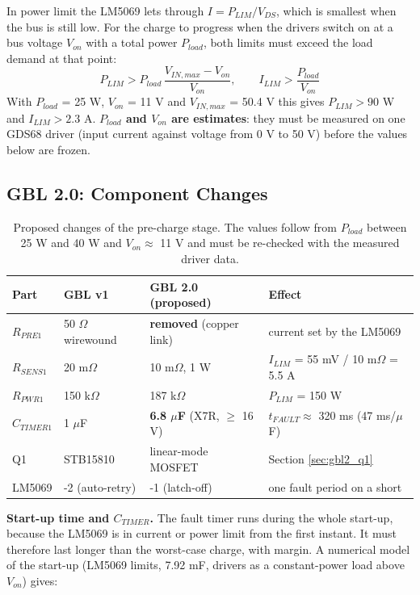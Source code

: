 \documentclass[11pt,a4paper]{article}
\begin{document}
In power limit the LM5069 lets through $I = P_{LIM} / V_{DS}$, which is smallest when the bus is still low. For the charge to progress when the drivers switch on at a bus voltage $V_{on}$ with a total power $P_{load}$, both limits must exceed the load demand at that point:
\begin{equation}
P_{LIM} > P_{load} \, \frac{V_{IN,max} - V_{on}}{V_{on}}, \qquad I_{LIM} > \frac{P_{load}}{V_{on}}
\end{equation}
With $P_{load}$ = 25 W, $V_{on}$ = 11 V and $V_{IN,max}$ = 50.4 V this gives $P_{LIM} > 90$ W and $I_{LIM} > 2.3$ A. \textbf{$P_{load}$ and $V_{on}$ are estimates}: they must be measured on one GDS68 driver (input current against voltage from 0 V to 50 V) before the values below are frozen.

\subsection{GBL 2.0: Component Changes}

\begin{table}[H]
\centering
\small
\begin{tabular}{llll}
\toprule
Part & GBL v1 & GBL 2.0 (proposed) & Effect \\
\midrule
$R_{PRE1}$ & 50 $\Omega$ wirewound & \textbf{removed} (copper link) & current set by the LM5069 \\
$R_{SENS1}$ & 20 m$\Omega$ & 10 m$\Omega$, 1 W & $I_{LIM}$ = 55 mV / 10 m$\Omega$ = 5.5 A \\
$R_{PWR1}$ & 150 k$\Omega$ & 187 k$\Omega$ & $P_{LIM}$ = 150 W \\
$C_{TIMER1}$ & 1 $\mu$F & \textbf{6.8 $\mu$F} (X7R, $\geq$ 16 V) & $t_{FAULT} \approx$ 320 ms (47 ms/$\mu$F) \\
Q1 & STB15810 & linear-mode MOSFET & Section \ref{sec:gbl2_q1} \\
LM5069 & -2 (auto-retry) & -1 (latch-off) & one fault period on a short \\
\bottomrule
\end{tabular}
\caption{Proposed changes of the pre-charge stage. The values follow from $P_{load}$ between 25 W and 40 W and $V_{on} \approx$ 11 V and must be re-checked with the measured driver data.}
\end{table}

\textbf{Start-up time and $C_{TIMER}$.} The fault timer runs during the whole start-up, because the LM5069 is in current or power limit from the first instant. It must therefore last longer than the worst-case charge, with margin. A numerical model of the start-up (LM5069 limits, 7.92 mF, drivers as a constant-power load above $V_{on}$) gives:
\end{document}
